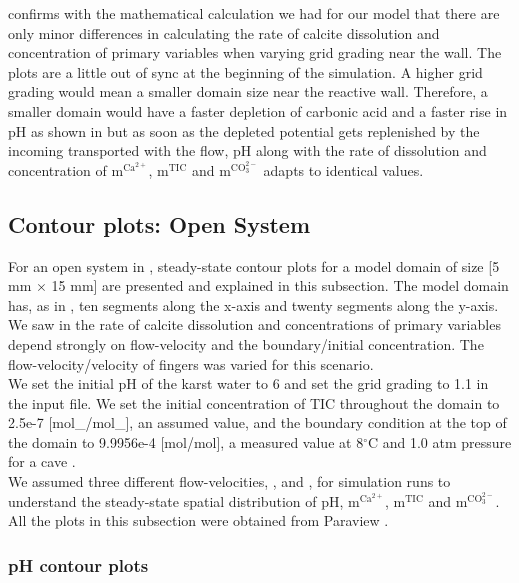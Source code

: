  confirms with the mathematical calculation we had for our model that there are only minor differences 
in calculating the rate of calcite dissolution and concentration of primary variables when varying grid grading near the wall. 
The plots are a little out of sync at the beginning of the simulation. A higher grid grading would mean a smaller domain size near 
the reactive wall. Therefore, a smaller domain would have a faster depletion of carbonic acid and a faster rise in pH as shown in  but 
as soon as the depleted potential gets replenished by the incoming  transported with the flow, pH along with the rate of dissolution and concentration of 
$\mathrm{m^{Ca^{2+}}}$, $\mathrm{m^{TIC}}$ and $\mathrm{m^{CO_3^{2-}}}$ adapts to identical values. 

\subsection{Contour plots: Open System} \label{ssec:contour}
For an open system in \DuMuX, steady-state contour plots for a model domain of size [5 mm $\times$ 15 mm] are presented and explained in this subsection.
The model domain has, as in , ten segments along the x-axis and twenty segments along the y-axis. We saw in 
the rate of calcite dissolution and concentrations of primary variables depend strongly on flow-velocity and the boundary/initial  concentration. 
The flow-velocity/velocity of  fingers was varied for this scenario. \\
We set the initial pH of the karst water to 6 and set the grid grading to 1.1 in the input file. 
We set the initial concentration of TIC throughout the domain to 2.5e-7 [mol\_/mol\_], an assumed value, and the 
boundary condition at the top of the domain to 9.9956e-4 [mol/mol], a measured value at 8$^{\circ}$C and 1.0 atm pressure for a cave \cite{Class2020}. \\
We assumed three different flow-velocities, ,  and , for simulation runs to understand the steady-state spatial distribution of 
pH, $\mathrm{m^{Ca^{2+}}}$, $\mathrm{m^{TIC}}$ and $\mathrm{m^{CO_3^{2-}}}$. 
All the plots in this subsection were obtained from Paraview \cite{ahrens2005paraview}.

\subsubsection*{pH contour plots} \label{sssec:contourpH}

